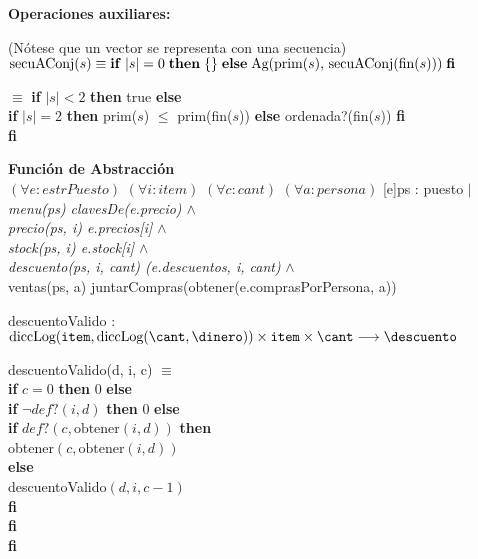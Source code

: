 \documentclass[../main.tex]{subfiles}
\begin{document}
\begin{representacion}
{{\large\bfseries Operaciones auxiliares:}


(Nótese que un vector se representa con una secuencia)\\
\(
\text{secuAConj}(s) \equiv \text{\textbf{if}}\;|s| = 0\;\text{\textbf{then}}\;\{\}\;\text{\textbf{else}}\;\text{Ag(prim($s$), secuAConj(fin($s$)))} \; \textbf{fi}
\)

 $\equiv$ \textbf{if} $|s| < 2$ \textbf{then} true \textbf{else}\\
 \textbf{if} $|s| = 2$ \textbf{then} prim($s$) $\leqslant$ prim(fin($s$)) \textbf{else} ordenada?(fin($s$)) \textbf{fi} \\
\textbf{fi}






{\large\bfseries Función de Abstracción} \\
{$\left( \forall e:estrPuesto \right)$}
{$\left( \forall i: item \right)$}
{$\left( \forall c: cant \right)$}
{$\left( \forall a: persona \right)$}
[e]{ps : puesto $|$}
\textit{menu(ps) \igobs clavesDe(e.precio) $\land$ \\
precio(ps, i) \igobs e.precios[i]  $\land$ \\
stock(ps, i) \igobs e.stock[i] $\land$ \\
descuento(ps, i, cant) \igobs {}(e.descuentos, i, cant)} $\land$ \\
ventas(ps, a) \igobs juntarCompras(obtener(e.comprasPorPersona, a))
\par\vspace{5mm}

descuentoValido : $\text{diccLog}(\Item, \text{diccLog}(\cant, \dinero)) \times \Item \times \cant \longrightarrow \descuento$

descuentoValido(d, i, c) $\equiv$ \\
\textbf{if} $c = 0$ \textbf{then} $0$ \textbf{else} \\
 \textbf{if} $\neg def?(i, d)$ \textbf{then} 0 \textbf{else} \\
 \textbf{if} $def?(c, \text{obtener}(i, d))$ \textbf{then} \\
 obtener$(c, \text{obtener}(i, d))$ \\
 \textbf{else} \\
 descuentoValido$(d, i, c - 1)$ \\
 \textbf{fi} \\
 \textbf{fi} \\
\textbf{fi}

}
\end{representacion}
\end{document}
